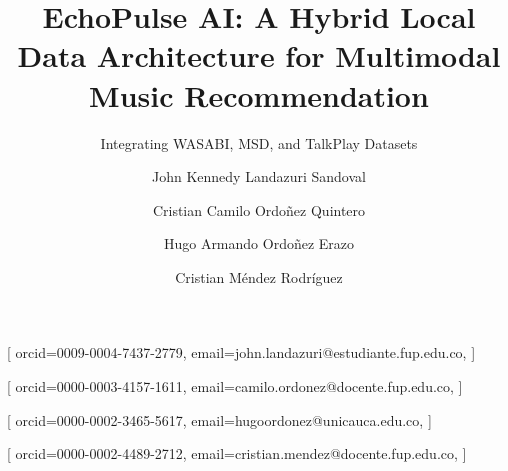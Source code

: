 \documentclass[]{ceurart}
\begin{document}


\title{EchoPulse AI: A Hybrid Local Data Architecture for Multimodal Music
  Recommendation}
\subtitle{Integrating WASABI, MSD, and TalkPlay Datasets}

\author[1]{John Kennedy Landazuri Sandoval}[%
orcid=0009-0004-7437-2779,
email=john.landazuri@estudiante.fup.edu.co,
]
\cormark[1]
\fnmark[1]

\author[1]{Cristian Camilo Ordoñez Quintero}[%
orcid=0000-0003-4157-1611,
email=camilo.ordonez@docente.fup.edu.co,
]
\cormark[2]
\fnmark[1]

\author[2]{Hugo Armando Ordoñez Erazo}[%
orcid=0000-0002-3465-5617,
email=hugoordonez@unicauca.edu.co,
]
\fnmark[1]

\author[1]{Cristian Méndez Rodríguez}[%
orcid=0000-0002-4489-2712,
email=cristian.mendez@docente.fup.edu.co,
]

\address[1]{IMS Research Group, Fundación Universitaria de Popayán,
  Popayán, Cauca, Colombia}
\address[2]{Research Group on Technology and Information Management (GT),
  Universidad del Cauca, Popayán, Cauca, Colombia}

\end{document}
